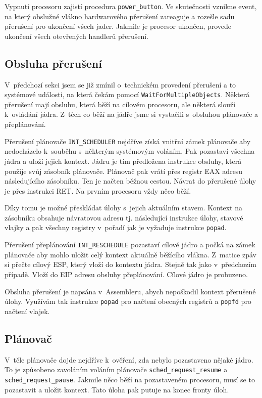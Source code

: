 \documentclass[a4paper,12pt]{article}
\begin{document}
Vypnutí procesoru zajistí procedura \verb+power_button+. Ve skutečnosti vznik\-ne event,
na který obslužné vlákno hardwarového přerušení zareaguje a rozešle sadu přerušení pro
ukončení všech jader. Jakmile je procesor ukončen, provede ukončení všech otevřených
handlerů přerušení.

\subsection{Obsluha přerušení}
V~předchozí sekci jsem se již zmínil o~technickém provedení přerušení a to systémové
události, na která čekám pomocí \verb+WaitForMultipleObjects+. Některá přerušení mají
obsluhu, která běží na cílovém procesoru, ale některá slouží k~ovládání jádra.
Z~těch co běží na jádře jsme si vystačili s~obsluhou plánovače a přeplánování.

Přerušení plánovače \verb+INT_SCHEDULER+ nejdříve získá vnitřní zámek plánovače aby
nedocházelo k~souběhu s~některým systémovým voláním. Pak pozastaví všechna jádra a uloží jejich kontext. Jádru je tím předložena instrukce obsluhy, která použije svůj zásobník plánovače.
Plánovač pak vrátí přes registr EAX adresu následujícího zásobníku. Ten je načten běžnou cestou.
Návrat do přerušené úlohy je přes instrukci RET. Na prvním procesoru vždy něco běží.

Díky tomu je možné přeskládat úlohy s~jejich aktuálním stavem. Kontext na zásobníku
obsahuje návratovou adresu tj. následující instrukce úlohy, stavové vlajky a pak všechny
registry v~pořadí jak je vyžaduje instrukce \texttt{popad}.

Přerušení přeplánování \verb+INT_RESCHEDULE+ pozastaví cílové jádro a počká na zámek
plánovače aby mohlo uložit celý kontext aktuálně běžícího vlákna. Z~matice zpáv si přečte
cílový ESP, který vloží do kontextu jádra. Stejně tak jako v~předchozím případě. Vloží
do EIP adresu obsluhy přeplánování. Cílové jádro je probuzeno.

Obsluha přerušení je napsána v~Assembleru, abych nepoškodil kontext přerušené úlohy. Využívám tak
instrukce \texttt{popad} pro načtení obecných registrů a  \texttt{popfd} pro načtení vlajek.

\subsection{Plánovač}
V~těle plánovače dojde nejdříve k~ověření, zda nebylo pozastaveno nějaké jádro. To je
způsobeno zavoláním voláním plánovače \verb+sched_request_resume+ a \verb+sched_request_pause+.
Jakmile něco běží na pozastaveném procesoru, musí se to pozastavit a uložit kontext.
Tato úloha pak putuje na konec fronty úloh.
\end{document}
